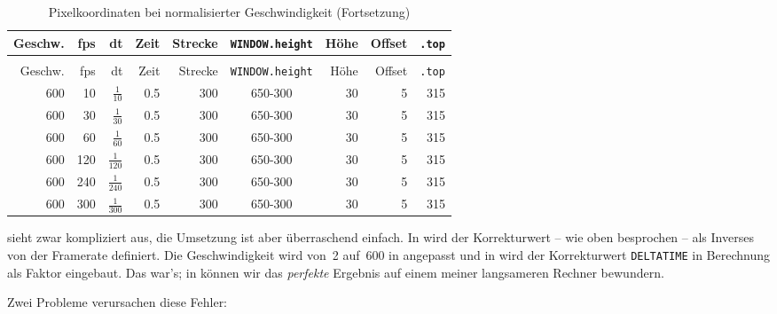 \begin{longtable}{r@{ * }r@{ * }r@{ * }r@{ = }r@{ $\rightarrow$ }c@{ - }r@{ - }r@{ = }r}%
	\caption{Pixelkoordinaten bei normalisierter Geschwindigkeit}\label{tabFpsBewegung03} \\[1em]
    Geschw. & fps & dt  & Zeit  & Strecke & \texttt{WINDOW.height} & Höhe & Offset & \texttt{.top}\\[0.5em]\hline\hline
	\hline
	\endfirsthead %
	\caption{Pixelkoordinaten bei normalisierter Geschwindigkeit (Fortsetzung)}\\[1em]
    Geschw. & fps & dt  & Zeit  & Strecke & \texttt{WINDOW.height} & Höhe & Offset & \texttt{.top}\\[0.5em]\hline\hline
	\hline
	\endhead %
	600  &   10 &  $\frac{1}{10}$   & 0.5 & 300 & 650-300 & 30 & 5 & 315 \\ \hline
	600  &   30 &  $\frac{1}{30}$   & 0.5 & 300 & 650-300 & 30 & 5 & 315 \\ \hline
	600  &   60 &  $\frac{1}{60}$   & 0.5 & 300 & 650-300 & 30 & 5 & 315 \\ \hline
	600  &  120 &  $\frac{1}{120}$  & 0.5 & 300 & 650-300 & 30 & 5 & 315 \\ \hline
	600  &  240 &  $\frac{1}{240}$  & 0.5 & 300 & 650-300 & 30 & 5 & 315 \\ \hline
	600  &  300 &  $\frac{1}{300}$  & 0.5 & 300 & 650-300 & 30 & 5 & 315 \\ \hline
\end{longtable} 

 sieht zwar kompliziert aus, die Umsetzung ist aber überraschend einfach. In  wird der Korrekturwert -- wie oben besprochen -- als Inverses von der Framerate definiert. Die Geschwindigkeit wird von~2 auf~600 in  angepasst und in  wird der Korrekturwert \texttt{DELTATIME} in Berechnung als Faktor eingebaut. Das war's; in  können wir das \emph{perfekte} Ergebnis auf einem meiner langsameren Rechner bewundern. 


Zwei Probleme verursachen diese Fehler:

